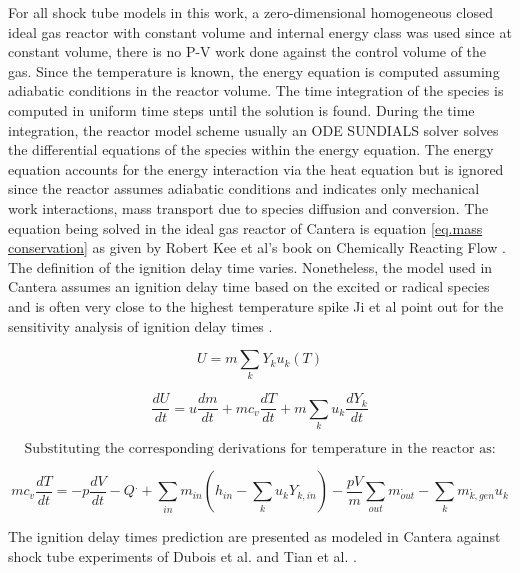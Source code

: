 For all shock tube models in this work, a zero-dimensional homogeneous closed ideal gas reactor with constant volume and internal energy class was used since at constant volume, there is no P-V work done against the control volume of the gas. Since the temperature is known, the energy equation is computed assuming adiabatic conditions in the reactor volume. The time integration of the species is computed in uniform time steps until the solution is found. During the time integration, the reactor model scheme usually an ODE SUNDIALS solver \cite{hindmarsh2005sundials} solves the differential equations of the species within the energy equation. The energy equation accounts for the energy interaction via the heat equation but is ignored since the reactor assumes adiabatic conditions and indicates only mechanical work interactions, mass transport due to species diffusion and conversion.  The equation being solved in the ideal gas reactor  of Cantera is equation \ref{eq.mass conservation} as given by Robert Kee et al's book on Chemically Reacting Flow \cite{Kee2003ChemicallyPractice}. The definition of the ignition delay time varies. Nonetheless, the model used in Cantera assumes an ignition delay time based on the excited  or  radical species and is often very close to the highest temperature spike Ji et al point out for the sensitivity analysis of ignition delay times \cite{Ji2019EvolutionAutoignition}. 

\begin{equation}
    U = m\sum_k{Y_k u_k(T)}
\end{equation}

\begin{equation}
    \frac{dU}{dt} = u\frac{dm}{dt}+mc_v\frac{dT}{dt}+m\sum_k{u_k \frac{dY_k}{dt}}
\end{equation}

\[\text{Substituting the corresponding derivations for temperature in the reactor as:} \]


\begin{equation}
    mc_v\frac{dT}{dt}=-p\frac{dV}{dt} - Q^. + \sum_{in}{m_{in}(h_{in}- \sum_k{u_k Y_{k, in}}) -\frac{pV}{m}\sum_{out}{m_{out}^.} - \sum_k{m_{k, gen}^. u_k}}
    \label{eq.mass conservation}
\end{equation}

The ignition delay times prediction are presented as modeled in Cantera against shock tube experiments of Dubois et al.\cite{Dubois2009ExperimentalConditions} and Tian et al. \cite{Tian2014ComparativeN-Propylcyclohexane} .

